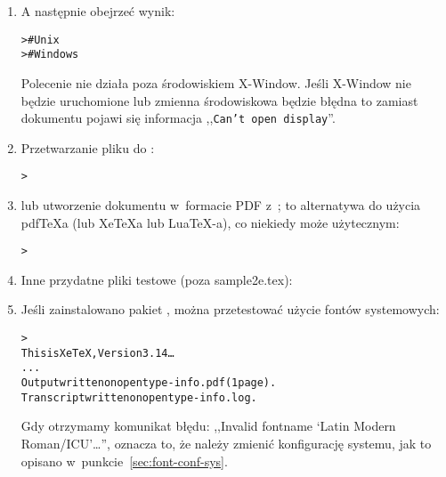 \documentclass{article}
\renewcommand{\samp}[1]{,,\texttt{#1}''}  %
\begin{document}
\begin{enumerate}
\item A następnie  obejrzeć wynik:
\begin{alltt}
>     # Unix
>   # Windows
\end{alltt}

Polecenie  nie działa poza środowiskiem
X-Window. Jeśli X-Window nie będzie uruchomione lub zmienna
środowiskowa   będzie błędna to zamiast
dokumentu pojawi się informacja \samp{Can't open display}.

\item Przetwarzanie pliku \dvi{} do \PS{}:
\begin{alltt}
> 
\end{alltt}

\item lub utworzenie dokumentu  w~formacie PDF z~\dvi{}; to alternatywa
do użycia pdf\TeX\-a (lub Xe\TeX\-a lub Lua\TeX-a), co niekiedy może użytecznym:

\begin{alltt}
> 
\end{alltt}

\item Inne przydatne pliki testowe (poza sample2e.tex):

\item Jeśli zainstalowano pakiet , można przetestować
 użycie fontów systemowych:
\begin{alltt}
> 
This is XeTeX, Version 3.14\dots
...
Output written on opentype-info.pdf (1 page).
Transcript written on opentype-info.log.
\end{alltt}
Gdy otrzymamy komunikat błędu:
,,Invalid fontname `Latin Modern Roman/ICU'\dots'', oznacza to, że
należy zmienić konfigurację systemu, jak to opisano
w~punkcie~\ref{sec:font-conf-sys}.
\end{enumerate}
\end{document}
